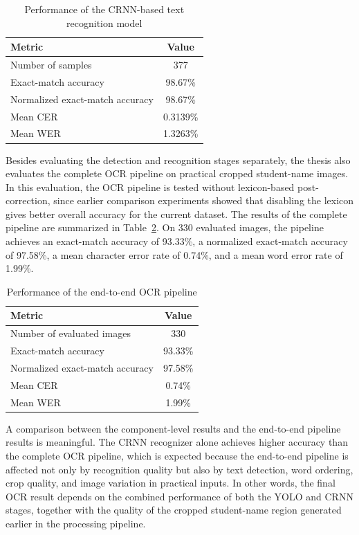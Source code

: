 \documentclass[../Main.tex]{subfiles}
\begin{document}
\begin{table}[H]
\centering
\caption{Performance of the CRNN-based text recognition model}
\label{table:crnn_recognition_results}
\begin{tabular}{lc}
\hline
\textbf{Metric} & \textbf{Value} \\ \hline
Number of samples & 377 \\
Exact-match accuracy & 98.67\% \\
Normalized exact-match accuracy & 98.67\% \\
Mean CER & 0.3139\% \\
Mean WER & 1.3263\% \\ \hline
\end{tabular}
\end{table}

Besides evaluating the detection and recognition stages separately, the thesis
also evaluates the complete OCR pipeline on practical cropped student-name
images. In this evaluation, the OCR pipeline is tested without lexicon-based
post-correction, since earlier comparison experiments showed that disabling the
lexicon gives better overall accuracy for the current dataset. The results of
the complete pipeline are summarized in Table~\ref{table:ocr_pipeline_results}. On 330 evaluated images, the pipeline
achieves an exact-match accuracy of 93.33\%, a normalized exact-match accuracy
of 97.58\%, a mean character error rate of 0.74\%, and a mean word error rate
of 1.99\%.

\begin{table}[H]
\centering
\caption{Performance of the end-to-end OCR pipeline}
\label{table:ocr_pipeline_results}
\begin{tabular}{lc}
\hline
\textbf{Metric} & \textbf{Value} \\ \hline
Number of evaluated images & 330 \\
Exact-match accuracy & 93.33\% \\
Normalized exact-match accuracy & 97.58\% \\
Mean CER & 0.74\% \\
Mean WER & 1.99\% \\ \hline
\end{tabular}
\end{table}

A comparison between the component-level results and the end-to-end pipeline
results is meaningful. The CRNN recognizer alone achieves higher accuracy than
the complete OCR pipeline, which is expected because the end-to-end pipeline is
affected not only by recognition quality but also by text detection, word
ordering, crop quality, and image variation in practical inputs. In other words,
the final OCR result depends on the combined performance of both the YOLO and
CRNN stages, together with the quality of the cropped student-name region
generated earlier in the processing pipeline.
\end{document}
